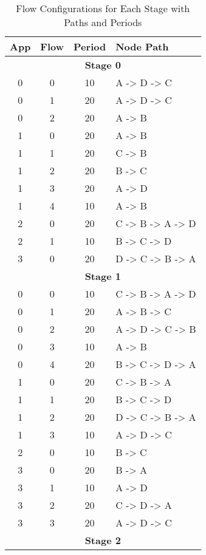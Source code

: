 \begin{table}[htbp]
    \centering
    \caption{Flow Configurations for Each Stage with Paths and Periods}
    \label{tab:flow_configs}
    \begin{tabular}{cccl}
        \hline
        \textbf{App} & \textbf{Flow} & \textbf{Period} & \textbf{Node Path} \\
        \hline
        \multicolumn{4}{c}{\textbf{Stage 0}} \\
        \hline
        0 & 0 & 10 & A -> D -> C \\
        0 & 1 & 20 & A -> D -> C \\
        0 & 2 & 20 & A -> B \\
        1 & 0 & 20 & A -> B \\
        1 & 1 & 20 & C -> B \\
        1 & 2 & 20 & B -> C \\
        1 & 3 & 20 & A -> D \\
        1 & 4 & 10 & A -> B \\
        2 & 0 & 20 & C -> B -> A -> D \\
        2 & 1 & 10 & B -> C -> D \\
        3 & 0 & 20 & D -> C -> B -> A \\
        \hline
        \multicolumn{4}{c}{\textbf{Stage 1}} \\
        \hline
        0 & 0 & 10 & C -> B -> A -> D \\
        0 & 1 & 20 & A -> B -> C \\
        0 & 2 & 20 & A -> D -> C -> B \\
        0 & 3 & 10 & A -> B \\
        0 & 4 & 20 & B -> C -> D -> A \\
        1 & 0 & 20 & C -> B -> A \\
        1 & 1 & 20 & B -> C -> D \\
        1 & 2 & 20 & D -> C -> B -> A \\
        1 & 3 & 10 & A -> D -> C \\
        2 & 0 & 10 & B -> C \\
        3 & 0 & 20 & B -> A \\
        3 & 1 & 10 & A -> D \\
        3 & 2 & 20 & C -> D -> A \\
        3 & 3 & 20 & A -> D -> C \\
        \hline
        \multicolumn{4}{c}{\textbf{Stage 2}} \\
        \hline

\end{tabular}
\end{table}

